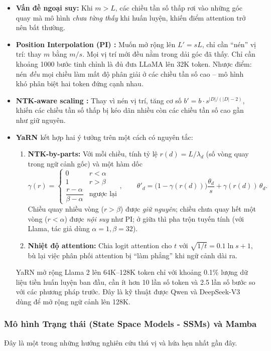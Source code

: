 \begin{itemize}
	\item \textbf{Vấn đề ngoại suy:} Khi $m > L$, các chiều tần số thấp rơi vào những góc quay mà mô hình \emph{chưa từng thấy} khi huấn luyện, khiến điểm attention trở nên bất thường.
	\item \textbf{Position Interpolation (PI) \cite{chen2023extending}:} Muốn mở rộng lên $L' = sL$, chỉ cần “nén” vị trí: thay $m$ bằng $m/s$. Mọi vị trí mới đều nằm trong dải góc đã thấy. Chỉ cần khoảng 1000 bước tinh chỉnh là đủ đưa LLaMA lên 32K token. Nhược điểm: nén \emph{đều} mọi chiều làm mất độ phân giải ở các chiều tần số cao -- mô hình khó phân biệt hai token đứng cạnh nhau.
	\item \textbf{NTK-aware scaling \cite{bloc972023ntkaware}:} Thay vì nén vị trí, tăng cơ số $b' = b \cdot s^{|D|/(|D|-2)}$, khiến các chiều tần số thấp bị kéo dãn nhiều còn các chiều tần số cao gần như giữ nguyên.
	\item \textbf{YaRN \cite{peng2023yarn}} kết hợp hai ý tưởng trên một cách có nguyên tắc:
	\begin{enumerate}
		\item \textbf{NTK-by-parts:} Với mỗi chiều, tính tỷ lệ $r(d) = L/\lambda_d$ (số vòng quay trong ngữ cảnh gốc) và một hàm dốc
		\[
		\gamma(r) = \begin{cases} 0 & r < \alpha \\ 1 & r > \beta \\ \dfrac{r-\alpha}{\beta-\alpha} & \text{ngược lại}\end{cases}, \qquad
		\theta'_d = \big(1-\gamma(r(d))\big)\frac{\theta_d}{s} + \gamma(r(d))\,\theta_d .
		\]
		Chiều quay nhiều vòng ($r > \beta$) được \emph{giữ nguyên}; chiều chưa quay hết một vòng ($r < \alpha$) được \emph{nội suy} như PI; ở giữa thì pha trộn tuyến tính (với Llama, tác giả dùng $\alpha=1, \beta=32$).
		\item \textbf{Nhiệt độ attention:} Chia logit attention cho $t$ với $\sqrt{1/t} = 0.1 \ln s + 1$, bù lại việc phân phối attention bị “làm phẳng” khi ngữ cảnh dài ra.
	\end{enumerate}
	YaRN mở rộng Llama 2 lên 64K--128K token chỉ với khoảng 0.1\% lượng dữ liệu tiền huấn luyện ban đầu, cần ít hơn 10 lần số token và 2.5 lần số bước so với các phương pháp trước. Đây là kỹ thuật được Qwen và DeepSeek-V3 dùng để mở rộng ngữ cảnh lên 128K.
\end{itemize}
\subsubsection{Mô hình Trạng thái (State Space Models - SSMs) và Mamba}
Đây là một trong những hướng nghiên cứu thú vị và hứa hẹn nhất gần đây.

